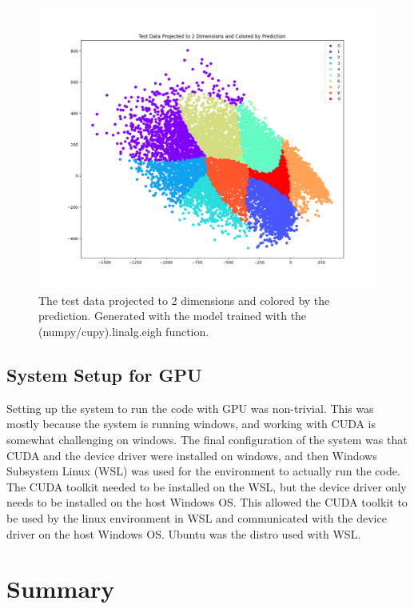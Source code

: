 \documentclass[12pt, twocolumn]{article}
\begin{document}
\begin{figure}
    \centering
    \includegraphics[width=\textwidth]{images/CPUProjectedTestDataPrediction.png}
    \caption{The test data projected to 2 dimensions and colored by the prediction. Generated with the model trained with the (numpy/cupy).linalg.eigh function.%
      \label{fig:CPUProjectedTestDataPrediction}}
\end{figure}


\subsection{System Setup for GPU}
Setting up the system to run the code with GPU was non-trivial. This was mostly because the system is running windows, and working with CUDA is somewhat challenging on windows. The final configuration of the system was that CUDA and the device driver were installed on windows, and then Windows Subsystem Linux (WSL) was used for the environment to actually run the code. The CUDA toolkit needed to be installed on the WSL, but the device driver only needs to be installed on the host Windows OS. This allowed the CUDA toolkit to be used by the linux environment in WSL and communicated with the device driver on the host Windows OS. Ubuntu was the distro used with WSL.



\section{ Summary}


  \printbibliography
\end{document}

